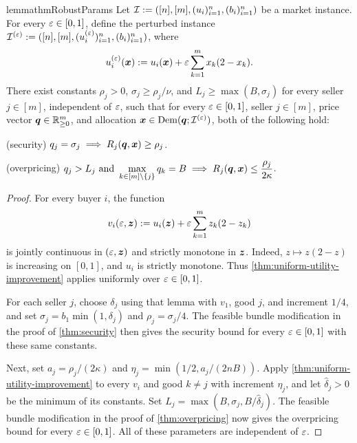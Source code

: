 \begin{restatable}{lemma}{thmRobustParams}
\label{thm:robust-params}
Let $\mathcal{I} := ([n], [m], (u_i)_{i=1}^n, (b_i)_{i=1}^n)$ be a market instance.
For every $\varepsilon \in [0, 1]$, define the perturbed instance
$\mathcal{I}^{(\varepsilon)} := ([n], [m], (u_i^{(\varepsilon)})_{i=1}^n, (b_i)_{i=1}^n)$, where
\[ u_i^{(\varepsilon)}(\bm{x}) := u_i(\bm{x}) + \varepsilon \sum_{k=1}^m x_k(2-x_k). \]
%
There exist constants $\rho_j > 0$, $\sigma_j \ge \rho_j/\nu$, and $L_j \ge \max(B, \sigma_j)$
for every seller $j \in [m]$, independent of $\varepsilon$,
such that for every $\varepsilon \in [0, 1]$, seller $j \in [m]$, price vector $\bm{q} \in \mathbb{R}_{\ge 0}^m$,
and allocation $\bm{x} \in \operatorname{Dem}(\bm{q}; \mathcal{I}^{(\varepsilon)})$, both of the following hold:
\begin{tightenum}
\item (security) $q_j = \sigma_j \implies R_j(\bm{q}, \bm{x}) \ge \rho_j$.
\item (overpricing)
    $\displaystyle q_j > L_j \text{ and } \max_{k \in [m] \setminus \{j\}} q_k = B
        \implies R_j(\bm{q}, \bm{x}) \le \frac{\rho_j}{2\kappa}$.
\end{tightenum}
\end{restatable}
\begin{proof}
For every buyer $i$, the function
\[ v_i(\varepsilon, \bm{z}) := u_i(\bm{z}) + \varepsilon \sum_{k = 1}^m z_k(2 - z_k) \]
is jointly continuous in $(\varepsilon, \bm{z})$ and strictly monotone in $\bm{z}$.
Indeed, $z \mapsto z(2 - z)$ is increasing on $[0, 1]$, and $u_i$ is strictly monotone.
Thus \cref{thm:uniform-utility-improvement} applies uniformly over $\varepsilon \in [0, 1]$.

For each seller $j$, choose $\delta_j$ using that lemma with $v_1$, good $j$,
and increment $1/4$, and set $\sigma_j = b_1 \min(1, \delta_j)$ and $\rho_j = \sigma_j/4$.
The feasible bundle modification in the proof of \cref{thm:security}
then gives the security bound for every $\varepsilon \in [0, 1]$ with these same constants.

Next, set $a_j = \rho_j/(2\kappa)$ and
$\eta_j = \min(1/2, a_j/(2nB))$.
Apply \cref{thm:uniform-utility-improvement} to every $v_i$ and good $k \ne j$
with increment $\eta_j$, and let $\widehat{\delta}_j > 0$ be the minimum of its constants.
Set $L_j = \max(B, \sigma_j, B/\widehat{\delta}_j)$.
The feasible bundle modification in the proof of \cref{thm:overpricing}
now gives the overpricing bound for every $\varepsilon \in [0, 1]$.
All of these parameters are independent of $\varepsilon$.
\end{proof}


